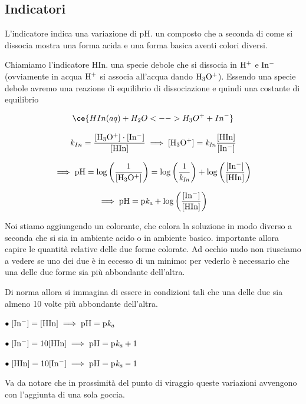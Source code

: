 \subsection{Indicatori}
L'indicatore indica una variazione di pH. \E un composto che a seconda di come si dissocia mostra una forma acida e una forma basica aventi colori diversi.

Chiamiamo l'indicatore HIn. \E una specie debole che si dissocia in $\rm H^+$ e $\rm In^-$ (ovviamente in acqua $\rm H^+$ si associa all'acqua dando $\rm H_3O^+$). Essendo una specie debole avremo una reazione di equilibrio di dissociazione e quindi una costante di equilibrio

$$\ce{HIn(aq) + H_2O <--> H_3O^+ + In^-}$$

$$k_{In}=\frac{\rm{[H_3O^+]} \cdot \rm{[In^-]}}{\rm{[HIn]}}\implies \rm{[H_3O^+]}=\textit{k}_{\textit{In}} \frac{\rm{[HIn]}}{\rm{[In^-]}}$$


$$\implies \rm pH = log \left( \frac{1}{[H_3O^+]} \right) = log \left( \frac{1}{\textit{k}_{\textit{In}}} \right) + log \left( \frac{\rm{[In^-]}}{\rm{[HIn]}} \right)$$

$$\implies \rm pH= p\textit{k}_\textit{a} + log \left( \frac{\rm{[In^-]}}{\rm{[HIn]}} \right)$$

Noi stiamo aggiungendo un colorante, che colora la soluzione in modo diverso a seconda che si sia in ambiente acido o in ambiente basico. \E importante allora capire le quantità relative delle due forme colorate. Ad occhio nudo non riusciamo a vedere se uno dei due è in eccesso di un minimo: per vederlo è necessario che una delle due forme sia più abbondante dell'altra.

Di norma allora si immagina di essere in condizioni tali che una delle due sia almeno 10 volte più abbondante dell'altra. 

\vspace{0.2cm}$\bullet \rm \; [In^-]=[HIn] \implies pH=p\textit{k}_{\textit{a}}$

\vspace{0.2cm}$\bullet \rm \; [In^-]=10[HIn] \implies pH=p\textit{k}_{\textit{a}}+1$

\vspace{0.2cm}$\bullet \rm \; [HIn]=10[In^-] \implies pH=p\textit{k}_{\textit{a}}-1$

\vspace{0.2cm}Va da notare che in prossimità del punto di viraggio queste variazioni avvengono con l'aggiunta di una sola goccia.

